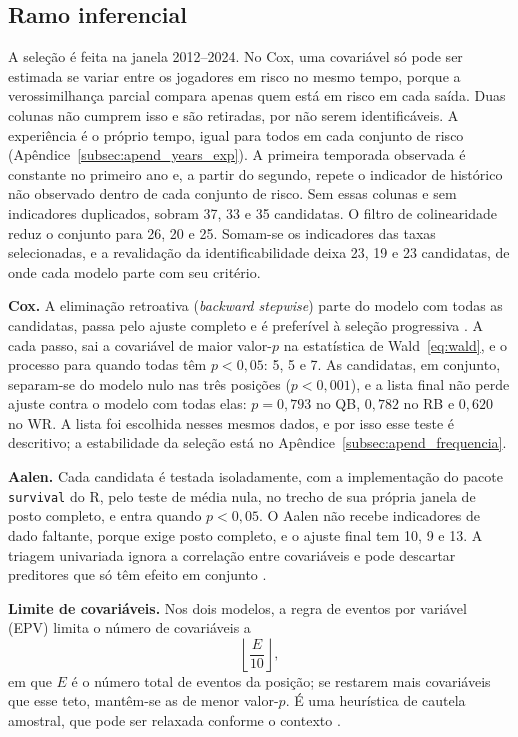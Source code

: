 \subsection{Ramo inferencial}
\label{sec:prep_inferencia}

A seleção é feita na janela 2012--2024. No Cox, uma covariável só pode ser estimada se variar entre os jogadores em risco no mesmo tempo, porque a verossimilhança parcial compara apenas quem está em risco em cada saída. Duas colunas não cumprem isso e são retiradas, por não serem identificáveis. A experiência é o próprio tempo, igual para todos em cada conjunto de risco (Apêndice~\ref{subsec:apend_years_exp}). A primeira temporada observada é constante no primeiro ano e, a partir do segundo, repete o indicador de histórico não observado dentro de cada conjunto de risco. Sem essas colunas e sem indicadores duplicados, sobram 37, 33 e 35 candidatas. O filtro de colinearidade reduz o conjunto para 26, 20 e 25. Somam-se os indicadores das taxas selecionadas, e a revalidação da identificabilidade deixa 23, 19 e 23 candidatas, de onde cada modelo parte com seu critério.

\label{subsec:selecao_cox}
\textbf{Cox.} A eliminação retroativa (\textit{backward stepwise}) parte do modelo com todas as candidatas, passa pelo ajuste completo e é preferível à seleção progressiva \citep{harrell2001}. A cada passo, sai a covariável de maior valor-$p$ na estatística de Wald~\eqref{eq:wald}, e o processo para quando todas têm $p<0{,}05$: 5, 5 e 7. As candidatas, em conjunto, separam-se do modelo nulo nas três posições ($p<0{,}001$), e a lista final não perde ajuste contra o modelo com todas elas: $p = 0{,}793$ no QB, $0{,}782$ no RB e $0{,}620$ no WR. A lista foi escolhida nesses mesmos dados, e por isso esse teste é descritivo; a estabilidade da seleção está no Apêndice~\ref{subsec:apend_frequencia}.

\textbf{Aalen.} Cada candidata é testada isoladamente, com a implementação do pacote \texttt{survival} do R, pelo teste de média nula, no trecho de sua própria janela de posto completo, e entra quando $p < 0{,}05$. O Aalen não recebe indicadores de dado faltante, porque exige posto completo, e o ajuste final tem 10, 9 e 13. A triagem univariada ignora a correlação entre covariáveis e pode descartar preditores que só têm efeito em conjunto \citep{harrell2001}.

\textbf{Limite de covariáveis.} Nos dois modelos, a regra de eventos por variável (EPV) \citep{harrell2001} limita o número de covariáveis a
\begin{equation}
    \left\lfloor \frac{E}{10} \right\rfloor,
    \label{eq:epv}
\end{equation}
em que $E$ é o número total de eventos da posição; se restarem mais covariáveis que esse teto, mantêm-se as de menor valor-$p$. É uma heurística de cautela amostral, que pode ser relaxada conforme o contexto \citep{vittinghoff2007}.

